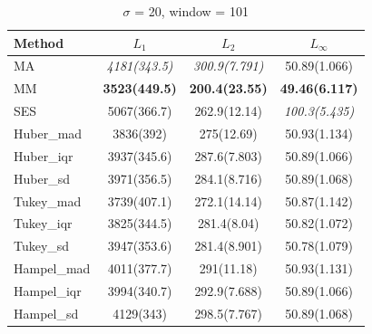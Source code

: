 \documentclass[letterpaper,12pt]{article}
\begin{document}
{%
\begin{table}[H]
\small
\centering
\caption{$\sigma$ = 20, window = 101}
\vspace{-2mm}
\label{tab:s20w101}
\begin{tabular}{lccc}
\toprule
Method      & $L_1$             & $L_2$             & $L_\infty$       \\
\midrule
MA          & \textit{4181(343.5)} & \textit{300.9(7.791)} & 50.89(1.066)    \\
MM          & \textbf{3523(449.5)} & \textbf{200.4(23.55)} & \textbf{49.46(6.117)} \\
SES         & 5067(366.7)       & 262.9(12.14)      & \textit{100.3(5.435)} \\
Huber\_mad  & 3836(392)         & 275(12.69)        & 50.93(1.134)     \\
Huber\_iqr  & 3937(345.6)       & 287.6(7.803)      & 50.89(1.066)     \\
Huber\_sd   & 3971(356.5)       & 284.1(8.716)      & 50.89(1.068)     \\
Tukey\_mad  & 3739(407.1)       & 272.1(14.14)      & 50.87(1.142)     \\
Tukey\_iqr  & 3825(344.5)       & 281.4(8.04)       & 50.82(1.072)     \\
Tukey\_sd   & 3947(353.6)       & 281.4(8.901)      & 50.78(1.079)     \\
Hampel\_mad & 4011(377.7)       & 291(11.18)        & 50.93(1.131)     \\
Hampel\_iqr & 3994(340.7)       & 292.9(7.688)      & 50.89(1.066)     \\
Hampel\_sd  & 4129(343)         & 298.5(7.767)      & 50.89(1.068)     \\
\bottomrule
\end{tabular}
\end{table}
\vspace{-6mm}

\clearpage

}
\end{document}
